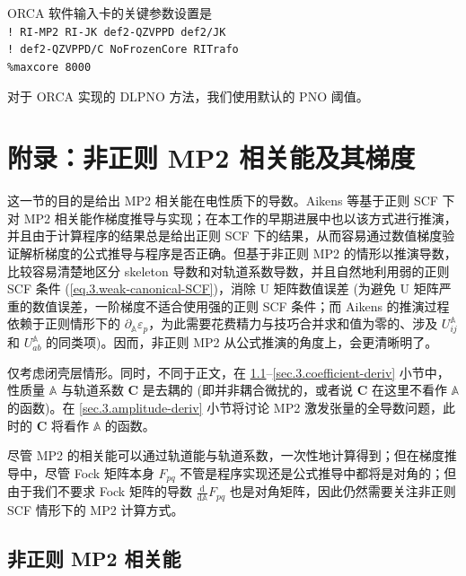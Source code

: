 \textsc{ORCA} 软件输入卡的关键参数设置是\\
\verb|! RI-MP2 RI-JK def2-QZVPPD def2/JK|\\
\verb|! def2-QZVPPD/C NoFrozenCore RITrafo|\\
\verb|%maxcore 8000|

对于 ORCA 实现的 DLPNO 方法，我们使用默认的 PNO 阈值。

\section{附录：非正则 MP2 相关能及其梯度}
\label{sec.3.non-canonical-mp2-gradient}

这一节的目的是给出 MP2 相关能在电性质下的导数。Aikens 等基于正则 SCF 下对 MP2 相关能作梯度推导与实现\cite{Aikens-Gordon.TCA.2003}；在本工作的早期进展中也以该方式进行推演，并且由于计算程序的结果总是给出正则 SCF 下的结果，从而容易通过数值梯度验证解析梯度的公式推导与程序是否正确。但基于非正则 MP2 的情形以推演导数，比较容易清楚地区分 skeleton 导数和对轨道系数导数，并且自然地利用弱的正则 SCF 条件 (\ref{eq.3.weak-canonical-SCF})，消除 U 矩阵数值误差 (为避免 U 矩阵严重的数值误差，一阶梯度不适合使用强的正则 SCF 条件；而 Aikens 的推演过程依赖于正则情形下的 $\partial_\mathbb{A} \varepsilon_p$，为此需要花费精力与技巧合并求和值为零的、涉及 $U_{ij}^\mathbb{A}$ 和 $U_{ab}^\mathbb{A}$ 的同类项)。因而，非正则 MP2 从公式推演的角度上，会更清晰明了。

仅考虑闭壳层情形。同时，不同于正文，在 \ref{sec.3.non-canonical}--\ref{sec.3.coefficient-deriv} 小节中，性质量 $\mathbb{A}$ 与轨道系数 $\mathbf{C}$ 是去耦的 (即并非耦合微扰的，或者说 $\mathbf{C}$ 在这里不看作 $\mathbb{A}$ 的函数)。在 \ref{sec.3.amplitude-deriv} 小节将讨论 MP2 激发张量的全导数问题，此时的 $\mathbf{C}$ 将看作 $\mathbb{A}$ 的函数。

尽管 MP2 的相关能可以通过轨道能与轨道系数，一次性地计算得到；但在梯度推导中，尽管 Fock 矩阵本身 $F_{pq}$ 不管是程序实现还是公式推导中都将是对角的；但由于我们不要求 Fock 矩阵的导数 $\frac{\mathrm{d}}{\mathrm{d} \mathbb{A}} F_{pq}$ 也是对角矩阵，因此仍然需要关注非正则 SCF 情形下的 MP2 计算方式。

\subsection{非正则 MP2 相关能}
\label{sec.3.non-canonical}

